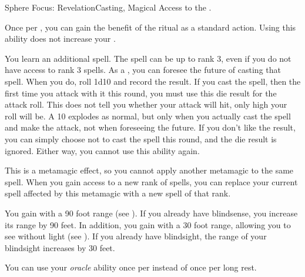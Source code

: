   \begin{magicalfeat}{Sphere Focus: Revelation}{Casting, Magical}
    \featpre Access to the  .

     Once per , you can gain the benefit of the  ritual as a standard action.
    Using this ability does not increase your .

     You learn an additional spell.
    The spell can be up to rank 3, even if you do not have access to rank 3 spells.
    As a , you can foresee the future of casting that spell.
    When you do, roll 1d10 and record the result.
    If you cast the spell, then the first time you attack with it this round, you must use this die result for the attack roll.
    This does not tell you whether your attack will hit, only high your roll will be.
    A 10 explodes as normal, but only when you actually cast the spell and make the attack, not when foreseeing the future.
    If you don't like the result, you can simply choose not to cast the spell this round, and the die result is ignored.
    Either way, you  cannot use this ability again.

    This is a metamagic effect, so you cannot apply another metamagic to the same spell.
    When you gain access to a new rank of spells, you can replace your current spell affected by this metamagic with a new spell of that rank.

     You gain  with a 90 foot range (see ).
    If you already have blindsense, you increase its range by 90 feet.
    In addition, you gain  with a 30 foot range, allowing you to see without light (see ).
    If you already have blindsight, the range of your blindsight increases by 30 feet.

     You can use your \textit{oracle} ability once per  instead of once per long rest.
  \end{magicalfeat}

